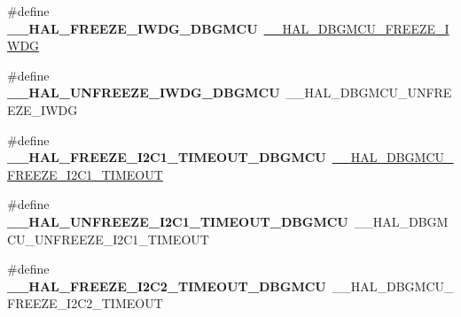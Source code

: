 \begin{DoxyCompactItemize}
\item 
\mbox{\label{group___h_a_l___d_b_g_m_c_u___aliased___macros_ga683080f08b123e73ee801508fac33188}} 
\#define {\bfseries \+\_\+\+\_\+\+H\+A\+L\+\_\+\+F\+R\+E\+E\+Z\+E\+\_\+\+I\+W\+D\+G\+\_\+\+D\+B\+G\+M\+CU}~\hyperlink{group___d_b_g_m_c_u___freeze___unfreeze_gabab7ab631ba58fb6246a9385e8af9d0d}{\+\_\+\+\_\+\+H\+A\+L\+\_\+\+D\+B\+G\+M\+C\+U\+\_\+\+F\+R\+E\+E\+Z\+E\+\_\+\+I\+W\+DG}
\item 
\mbox{\label{group___h_a_l___d_b_g_m_c_u___aliased___macros_ga73aaa0abfab57e061c9e64ee39f5e3c8}} 
\#define {\bfseries \+\_\+\+\_\+\+H\+A\+L\+\_\+\+U\+N\+F\+R\+E\+E\+Z\+E\+\_\+\+I\+W\+D\+G\+\_\+\+D\+B\+G\+M\+CU}~\+\_\+\+\_\+\+H\+A\+L\+\_\+\+D\+B\+G\+M\+C\+U\+\_\+\+U\+N\+F\+R\+E\+E\+Z\+E\+\_\+\+I\+W\+DG
\item 
\mbox{\label{group___h_a_l___d_b_g_m_c_u___aliased___macros_ga6e04cdfbd0408018f712455198c8120b}} 
\#define {\bfseries \+\_\+\+\_\+\+H\+A\+L\+\_\+\+F\+R\+E\+E\+Z\+E\+\_\+\+I2\+C1\+\_\+\+T\+I\+M\+E\+O\+U\+T\+\_\+\+D\+B\+G\+M\+CU}~\hyperlink{group___d_b_g_m_c_u___freeze___unfreeze_ga6160f642dcff812be3a04c5b5c66e31d}{\+\_\+\+\_\+\+H\+A\+L\+\_\+\+D\+B\+G\+M\+C\+U\+\_\+\+F\+R\+E\+E\+Z\+E\+\_\+\+I2\+C1\+\_\+\+T\+I\+M\+E\+O\+UT}
\item 
\mbox{\label{group___h_a_l___d_b_g_m_c_u___aliased___macros_gae0a68ca652c73463c72c0d6f164ef675}} 
\#define {\bfseries \+\_\+\+\_\+\+H\+A\+L\+\_\+\+U\+N\+F\+R\+E\+E\+Z\+E\+\_\+\+I2\+C1\+\_\+\+T\+I\+M\+E\+O\+U\+T\+\_\+\+D\+B\+G\+M\+CU}~\+\_\+\+\_\+\+H\+A\+L\+\_\+\+D\+B\+G\+M\+C\+U\+\_\+\+U\+N\+F\+R\+E\+E\+Z\+E\+\_\+\+I2\+C1\+\_\+\+T\+I\+M\+E\+O\+UT
\item 
\mbox{\label{group___h_a_l___d_b_g_m_c_u___aliased___macros_ga2877e6a523cce3f5d72e9fcb746db130}} 
\#define {\bfseries \+\_\+\+\_\+\+H\+A\+L\+\_\+\+F\+R\+E\+E\+Z\+E\+\_\+\+I2\+C2\+\_\+\+T\+I\+M\+E\+O\+U\+T\+\_\+\+D\+B\+G\+M\+CU}~\+\_\+\+\_\+\+H\+A\+L\+\_\+\+D\+B\+G\+M\+C\+U\+\_\+\+F\+R\+E\+E\+Z\+E\+\_\+\+I2\+C2\+\_\+\+T\+I\+M\+E\+O\+UT
\item 
\mbox{\label{group___h_a_l___d_b_g_m_c_u___aliased___macros_ga7f8561c59b23e6157a2a4854bfd7a152}} 

\end{DoxyCompactItemize}
